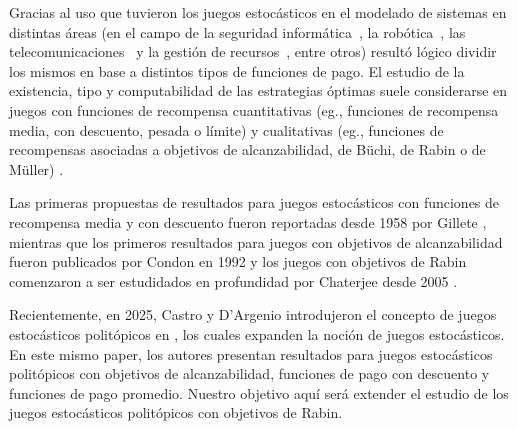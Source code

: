 

Gracias al uso que tuvieron los juegos estocásticos en el modelado de sistemas
en distintas áreas (en el campo de la seguridad informática~\cite{SGSecurity},
la robótica~\cite{SGInteractive}, las telecomunicaciones~\cite{SGM2M} y la
gestión de recursos~\cite{SGSmartGrid}, entre otros) resultó lógico dividir los
mismos en base a distintos tipos de funciones de pago. El estudio de la
existencia, tipo y computabilidad de las estrategias óptimas suele considerarse
en juegos con funciones de recompensa cuantitativas (eg., funciones de
recompensa media, con descuento, pesada o límite) y cualitativas (eg.,
funciones de recompensas asociadas a objetivos de alcanzabilidad, de Büchi, de
Rabin o de Müller) \cite{Chatterjee2007,Kučera2011,Chatterjee1}.

Las primeras propuestas de resultados para juegos estocásticos con funciones de
recompensa media y con descuento fueron reportadas desde 1958 por Gillete
\cite{Gillette1958}, mientras que los primeros resultados para juegos con
objetivos de alcanzabilidad fueron publicados por Condon en 1992
\cite{CONDON1992} y los juegos con objetivos de Rabin comenzaron a ser
estudidados en profundidad por Chaterjee desde 2005
\cite{ComplexityRabin,Chatterjee2007,Chatterjee1}.

Recientemente, en 2025, Castro y D'Argenio introdujeron el concepto de juegos
estocásticos politópicos en \cite{Polytopal}, los cuales expanden la noción de
juegos estocásticos.
En este mismo paper, los autores presentan resultados para juegos estocásticos
politópicos con objetivos de alcanzabilidad, funciones de pago con descuento y
funciones de pago promedio. Nuestro objetivo aquí será extender el estudio de
los juegos estocásticos politópicos con objetivos de Rabin.

